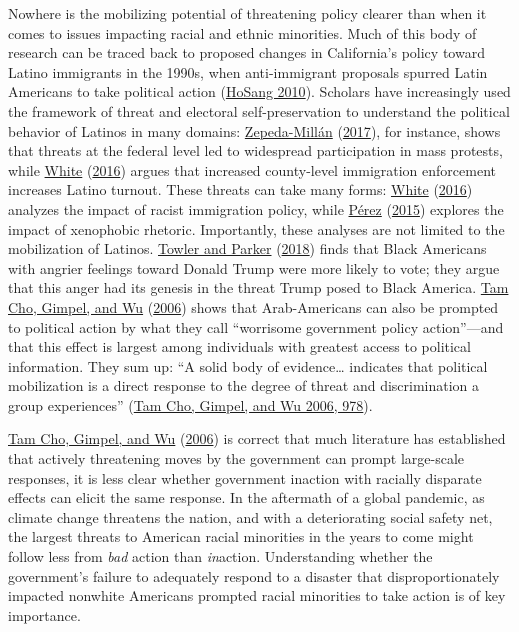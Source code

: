 \documentclass[
  12pt,
]{article}
\begin{document}
Nowhere is the mobilizing potential of threatening policy clearer than when it comes to issues impacting racial and ethnic minorities. Much of this body of research can be traced back to proposed changes in California's policy toward Latino immigrants in the 1990s, when anti-immigrant proposals spurred Latin Americans to take political action (\protect\hyperlink{ref-HoSang2010}{HoSang 2010}). Scholars have increasingly used the framework of threat and electoral self-preservation to understand the political behavior of Latinos in many domains: \protect\hyperlink{ref-Zepeda-Millan2017}{Zepeda-Millán} (\protect\hyperlink{ref-Zepeda-Millan2017}{2017}), for instance, shows that threats at the federal level led to widespread participation in mass protests, while \protect\hyperlink{ref-White2016}{White} (\protect\hyperlink{ref-White2016}{2016}) argues that increased county-level immigration enforcement increases Latino turnout. These threats can take many forms: \protect\hyperlink{ref-White2016}{White} (\protect\hyperlink{ref-White2016}{2016}) analyzes the impact of racist immigration policy, while \protect\hyperlink{ref-Perez2015}{Pérez} (\protect\hyperlink{ref-Perez2015}{2015}) explores the impact of xenophobic rhetoric. Importantly, these analyses are not limited to the mobilization of Latinos. \protect\hyperlink{ref-Towler2018}{Towler and Parker} (\protect\hyperlink{ref-Towler2018}{2018}) finds that Black Americans with angrier feelings toward Donald Trump were more likely to vote; they argue that this anger had its genesis in the threat Trump posed to Black America. \protect\hyperlink{ref-TamCho2006a}{Tam Cho, Gimpel, and Wu} (\protect\hyperlink{ref-TamCho2006a}{2006}) shows that Arab-Americans can also be prompted to political action by what they call ``worrisome government policy action''---and that this effect is largest among individuals with greatest access to political information. They sum up: ``A solid body of evidence\ldots{} indicates that political mobilization is a direct response to the degree of threat and discrimination a group experiences'' (\protect\hyperlink{ref-TamCho2006a}{Tam Cho, Gimpel, and Wu 2006, 978}).

\protect\hyperlink{ref-TamCho2006a}{Tam Cho, Gimpel, and Wu} (\protect\hyperlink{ref-TamCho2006a}{2006}) is correct that much literature has established that actively threatening moves by the government can prompt large-scale responses, it is less clear whether government inaction with racially disparate effects can elicit the same response. In the aftermath of a global pandemic, as climate change threatens the nation, and with a deteriorating social safety net, the largest threats to American racial minorities in the years to come might follow less from \emph{bad} action than \emph{in}action. Understanding whether the
government's failure to adequately respond to a disaster that disproportionately impacted nonwhite Americans prompted racial minorities to take action is of key importance.
\end{document}
